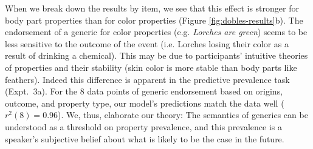 \documentclass[12pt,letterpaper]{article}
\begin{document}



When we break down the results by item, we see that this effect is  stronger for body part properties than for color properties (Figure \ref{fig:dobles-results}b).
The endorsement of a generic for color properties (e.g. \emph{Lorches are green}) seems to be less sensitive to the outcome of the event (i.e. Lorches losing their color as a result of drinking a chemical).
This may be due to participants' intuitive theories of properties and their stability (skin color is more stable than body parts like feathers).
Indeed this difference is apparent in the predictive prevalence task (Expt.~3a).
For the 8 data points of generic endorsement based on origins, outcome, and property type, our model's predictions match the data well ($r^2(8) = 0.96$).
We, thus, elaborate our theory:
The semantics of generics can be understood as a threshold on property prevalence, and this prevalence is a speaker's subjective belief about what is likely to be the case in the future.
\end{document}
